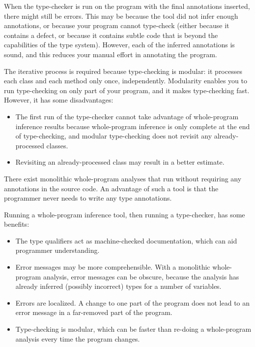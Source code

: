When the type-checker is run on the program with the final annotations
inserted, there might still be errors.  This may be because the tool did
not infer enough annotations, or because your program cannot type-check
(either because it contains a defect, or because it contains subtle code that
is beyond the capabilities of the type system).
However, each of the inferred annotations is sound, and this reduces your
manual effort in annotating the program.

The iterative process is required because type-checking is modular:  it
processes each class and each method only once, independently.  Modularity
enables you to run type-checking on only part of your program, and it makes
type-checking fast.  However, it has some disadvantages:
\begin{itemize}
\item
  The first run of the type-checker cannot take advantage of whole-program
  inference results because whole-program inference is only complete at the
  end of type-checking, and modular type-checking does not revisit any
  already-processed classes.
\item
  Revisiting an
  already-processed class may result in a better estimate.
\end{itemize}



There exist monolithic whole-program analyses that run without requiring any
annotations in the source code.  An advantage of such a tool is that the
programmer never needs to write any type annotations.

Running a whole-program inference tool, then running a type-checker, has
some benefits:
\begin{itemize}
\item
  The type qualifiers act as machine-checked documentation,
  which can aid programmer understanding.
\item
  Error messages may be more comprehensible.  With a monolithic
  whole-program analysis, error messages can be obscure, because the
  analysis has already inferred (possibly incorrect) types for a number of
  variables.
\item
  Errors are localized.  A change to one part of the program does not lead
  to an error message in a far-removed part of the program.
\item
  Type-checking is modular, which can be faster than re-doing a
  whole-program analysis every time the program changes.
\end{itemize}



